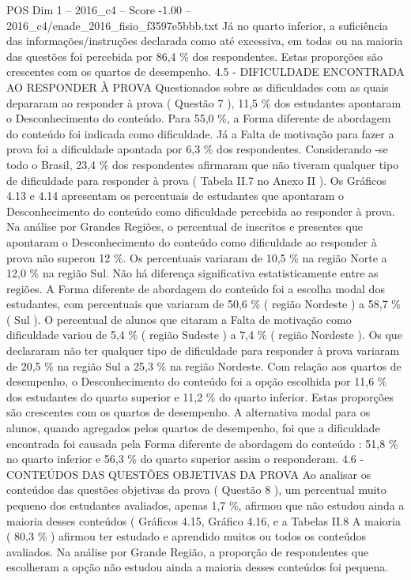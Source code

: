 \begin{textsample}{POS Dim 1 – 2016\_c4 – Score -1.00 – 2016\_c4/enade\_2016\_fisio\_f3597e5bbb.txt}
Já no quarto inferior, a suficiência das informações/instruções declarada como até excessiva, em todas ou na maioria das questões foi percebida por 86,4 \% dos respondentes.
Estas proporções são crescentes com os quartos de desempenho. 4.5 - DIFICULDADE ENCONTRADA AO RESPONDER À PROVA Questionados sobre as dificuldades com as quais depararam ao responder à prova ( Questão 7 ), 11,5 \% dos estudantes apontaram o Desconhecimento do conteúdo.
Para 55,0 \%, a Forma diferente de abordagem do conteúdo foi indicada como dificuldade.
Já a Falta de motivação para fazer a prova foi a dificuldade apontada por 6,3 \% dos respondentes.
Considerando -se todo o Brasil, 23,4 \% dos respondentes afirmaram que não tiveram qualquer tipo de dificuldade para responder à prova ( Tabela II.7 no Anexo II ).
Os Gráficos 4.13 e 4.14 apresentam os percentuais de estudantes que apontaram o Desconhecimento do conteúdo como dificuldade percebida ao responder à prova.
Na análise por Grandes Regiões, o percentual de inscritos e presentes que apontaram o Desconhecimento do conteúdo como dificuldade ao responder à prova não superou 12 \%.
Os percentuais variaram de 10,5 \% na região Norte a 12,0 \% na região Sul.
Não há diferença significativa estatisticamente entre as regiões.
A Forma diferente de abordagem do conteúdo foi a escolha modal dos estudantes, com percentuais que variaram de 50,6 \% ( região Nordeste ) a 58,7 \% ( Sul ).
O percentual de alunos que citaram a Falta de motivação como dificuldade variou de 5,4 \% ( região Sudeste ) a 7,4 \% ( região Nordeste ).
Os que declararam não ter qualquer tipo de dificuldade para responder à prova variaram de 20,5 \% na região Sul a 25,3 \% na região Nordeste.
Com relação aos quartos de desempenho, o Desconhecimento do conteúdo foi a opção escolhida por 11,6 \% dos estudantes do quarto superior e 11,2 \% do quarto inferior.
Estas proporções são crescentes com os quartos de desempenho.
A alternativa modal para os alunos, quando agregados pelos quartos de desempenho, foi que a dificuldade encontrada foi causada pela Forma diferente de abordagem do conteúdo : 51,8 \% no quarto inferior e 56,3 \% do quarto superior assim o responderam. 4.6 - CONTEÚDOS DAS QUESTÕES OBJETIVAS DA PROVA Ao analisar os conteúdos das questões objetivas da prova ( Questão 8 ), um percentual muito pequeno dos estudantes avaliados, apenas 1,7 \%, afirmou que não estudou ainda a maioria desses conteúdos ( Gráficos 4.15, Gráfico 4.16, e a Tabelas II.8 A maioria ( 80,3 \% ) afirmou ter estudado e aprendido muitos ou todos os conteúdos avaliados.
Na análise por Grande Região, a proporção de respondentes que escolheram a opção não estudou ainda a maioria desses conteúdos foi pequena.

\end{textsample}
